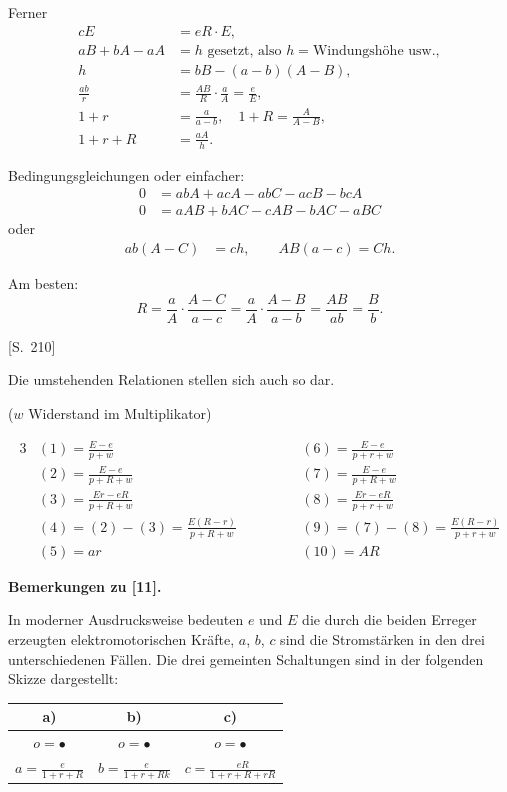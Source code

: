 \documentclass[12pt,a4paper]{article}
\begin{document}
Ferner
\begin{align*}
cE &= eR \cdot E, \\
aB + bA - aA &= h \text{ gesetzt, also } h = \text{Windungsh\"ohe usw.}, \\
h &= bB - (a-b)(A-B), \\
\frac{ab}{r} &= \frac{AB}{R} \cdot \frac{a}{A} = \frac{e}{E}, \\
1+r &= \frac{a}{a-b}, \quad 1+R = \frac{A}{A-B}, \\
1+r+R &= \frac{aA}{h}.
\end{align*}

Bedingungsgleichungen oder einfacher:
\begin{align*}
0 &= abA + acA - abC - acB - bcA \\
0 &= aAB + bAC - cAB - bAC - aBC
\end{align*}
oder
\begin{align*}
ab(A-C) &= ch, \qquad AB(a-c) = Ch.
\end{align*}

Am besten:
\[
R = \frac{a}{A} \cdot \frac{A-C}{a-c} = \frac{a}{A} \cdot \frac{A-B}{a-b} = \frac{AB}{ab} = \frac{B}{b}.
\]

[S.~210]

Die umstehenden Relationen stellen sich auch so dar.

\begin{center}
($w$ Widerstand im Multiplikator)
\end{center}

\begin{alignat*}{3}
&(1) = \frac{E-e}{p+w} &\quad& (6) = \frac{E-e}{p+r+w} \\
&(2) = \frac{E-e}{p+R+w} && (7) = \frac{E-e}{p+R+w} \\
&(3) = \frac{Er-eR}{p+R+w} && (8) = \frac{Er-eR}{p+r+w} \\
&(4) = (2)-(3) = \frac{E(R-r)}{p+R+w} \qquad && (9) = (7)-(8) = \frac{E(R-r)}{p+r+w} \\
&(5) = ar \qquad && (10) = AR
\end{alignat*}

\medskip\noindent
\textbf{Bemerkungen zu [11].}

In moderner Ausdrucksweise bedeuten $e$ und $E$ die durch die beiden Erreger erzeugten elektromotorischen Kr\"afte, $a$, $b$, $c$ sind die Stromst\"arken in den drei unterschiedenen F\"allen. Die drei gemeinten Schaltungen sind in der folgenden Skizze dargestellt:

\begin{center}
\begin{tabular}{c|c|c}
a) & b) & c) \\
\hline
$o=\bullet$ & $o=\bullet$ & $o=\bullet$ \\
$a = \frac{e}{1+r+R}$ & $b = \frac{e}{1+r+Rk}$ & $c = \frac{eR}{1+r+R+rR}$
\end{tabular}
\end{center}
\end{document}
